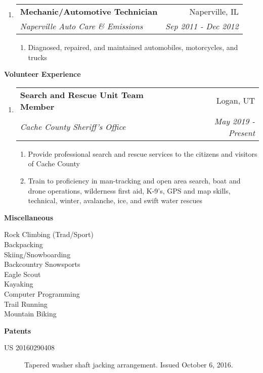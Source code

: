 \documentclass[letterpaper,10pt]{extarticle}
\makeatletter
\newcommand\tab[1][.25cm]{\hspace*{#1}} %
\newcommand{\resheading}[1]{{\large \colorbox{mygrey}{\begin{minipage}{\textwidth}{\textbf{#1 \vphantom{p\^{E}}}}\end{minipage}}}}
\newcommand{\ressubheading}[4]{
\begin{tabular*}{7.5in}{l@{\extracolsep{\fill}}r}
		\tab\textbf{#1} & #2 \\
		\tab\textit{#3} & \textit{#4} \\
\end{tabular*}\vspace{-6pt}}
\newcommand{\resitem}[1]{\item #1 \vspace{-2pt}}
\makeatother
\begin{document}
\begin{enumerate}

	

\item[]
	\ressubheading{Mechanic/Automotive Technician}{Naperville, IL}{Naperville Auto Care \& Emissions}{Sep 2011 - Dec 2012}
	\begin{enumerate}
		\resitem[--]{Diagnosed, repaired, and maintained automobiles, motorcycles, and trucks}
	\end{enumerate}

\end{enumerate}

\resheading{Volunteer Experience}
\vspace{-0.4cm}
\begin{enumerate}
\setlength\itemsep{-.5em}

\item[]
	\ressubheading{Search and Rescue Unit Team Member}{Logan, UT}{Cache County Sheriff's Office}{May 2019 - Present}
	\begin{enumerate}
		\setlength\itemsep{-.25em}
		\resitem[--]{Provide professional search and rescue services to the citizens and visitors of Cache County}
		\resitem[--]{Train to proficiency in man-tracking and open area search, boat and drone operations, wilderness first aid, K-9’s, GPS and map skills, technical, winter, avalanche, ice, and swift water rescues}
	\end{enumerate}
\end{enumerate}


\resheading{Miscellaneous}
\begin{description}
\vspace{-0.2in}


\item[] \hfill 
\begin{multicols}{3}
Rock Climbing (Trad/Sport) \\ Backpacking \\ Skiing/Snowboarding \\ Backcountry Snowsports \\ Eagle Scout  \\ Kayaking \\ Computer Programming \\ Trail Running \\ Mountain Biking
\end{multicols}




\end{description}


\resheading{Patents}

\begin{description}

\item[US 20160290408] Tapered washer shaft jacking arrangement. Issued October 6, 2016. 
\end{description}
\end{document}
